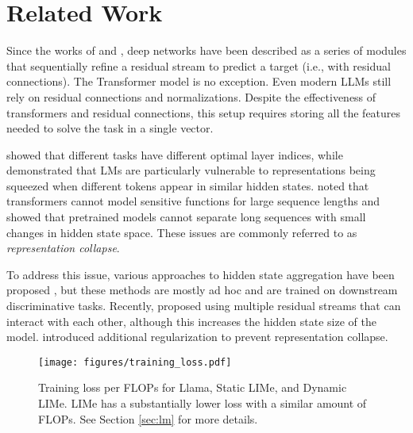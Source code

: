 \section{Related Work}
Since the works of \citet{srivastava2015highway} and \citet{he2015deep}, deep networks have been described as a series of modules that sequentially refine a residual stream to predict a target (i.e., with residual connections). The Transformer model \citep{vaswani2017attention} is no exception. Even modern LLMs \citep{grattafiori2024llama, jiang2023mistral, qwen2024qwen25, deepseek-ai2024deepseekv2} still rely on residual connections and normalizations. Despite the effectiveness of transformers and residual connections, this setup requires storing all the features needed to solve the task in a single vector.

\citet{tenney-etal-2019-bert} showed that different tasks have different optimal layer indices, while \citet{voita-etal-2019-bottom} demonstrated that LMs are particularly vulnerable to representations being squeezed when different tokens appear in similar hidden states. \citet{hahn-rofin-2024-sensitive} noted that transformers cannot model sensitive functions for large sequence lengths and \citet{barbero2024transformers} showed that pretrained models cannot separate long sequences with small changes in hidden state space. These issues are commonly referred to as \emph{representation collapse}.

To address this issue, various approaches to hidden state aggregation have been proposed \citep{cl_attn, DBLP:conf/interspeech/YangCCLLLLSCLHT21}, but these methods are mostly ad hoc and are trained on downstream discriminative tasks. Recently, \citet{zhu2024hyperconnections} proposed using multiple residual streams that can interact with each other, although this increases the hidden state size of the model. \citet{arefin2024seqvcr} introduced additional regularization to prevent representation collapse.


\begin{figure}[t]
    \centering
    \texttt{[image: figures/training\_loss.pdf]}
    \caption{Training loss per FLOPs for Llama, Static LIMe, and Dynamic LIMe. LIMe has a substantially lower loss with a similar amount of FLOPs. See Section \ref{sec:lm} for more details.}
    \label{fig:training_loss}
\end{figure}